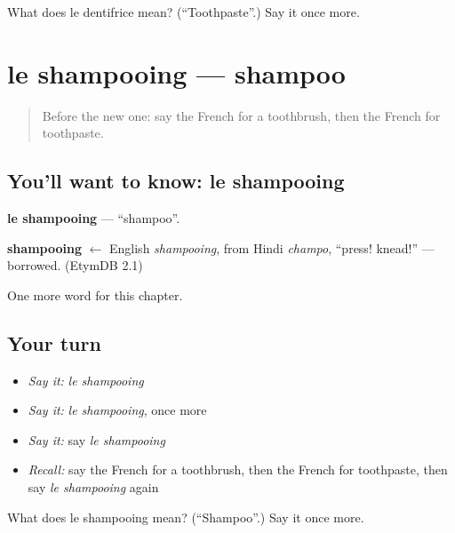 \begin{tcolorbox}[breakable,colback=teal!4,colframe=teal!35!black,title={Before you move on}]
What does le dentifrice mean? (\textquotedblleft{}Toothpaste\textquotedblright{}.) Say it once more.
\end{tcolorbox}
\section[le shampooing]{le shampooing — shampoo}

\label{lesson:FR-C114-shampooing}



\begin{quote}
Before the new one: say the French for a toothbrush, then the French for toothpaste.
\end{quote}

\subsection*{You'll want to know: le shampooing}
\textbf{le shampooing} — \textquotedblleft{}shampoo\textquotedblright{}.

\begin{cousinweb}
\textbf{shampooing} $\leftarrow$ English \emph{shampooing}, from Hindi \emph{champo}, \textquotedblleft{}press! knead!\textquotedblright{} — borrowed. (EtymDB 2.1)
\end{cousinweb}

\begin{grammarlens}[title={What you've built}]
One more word for this chapter.
\end{grammarlens}

\subsection*{Your turn}
\begin{itemize}
\raggedright
  \item \emph{Say it:} \emph{le shampooing}
  \item \emph{Say it:} \emph{le shampooing}, once more
  \item \emph{Say it:} say \emph{le shampooing}
  \item \emph{Recall:} say the French for a toothbrush, then the French for toothpaste, then say \emph{le shampooing} again
\end{itemize}

\begin{tcolorbox}[breakable,colback=teal!4,colframe=teal!35!black,title={Before you move on}]
What does le shampooing mean? (\textquotedblleft{}Shampoo\textquotedblright{}.) Say it once more.
\end{tcolorbox}
